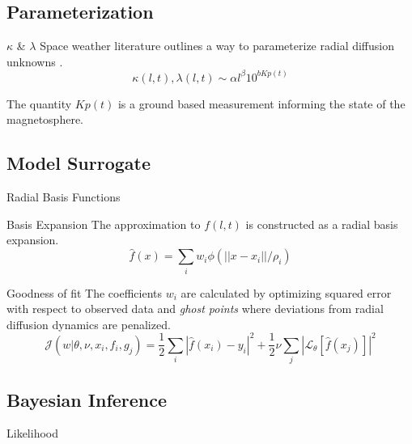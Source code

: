 \documentclass{beamer}
\begin{document}
\subsection{Parameterization}


\begin{frame}{$\kappa$ \& $\lambda$}
  Space weather literature outlines a way to parameterize radial
  diffusion unknowns \cite{JGRA:JGRA15067}.
  \begin{equation*}
    \kappa(l, t), \lambda(l, t) \sim \alpha l^{\beta} 10^{b Kp(t)}
  \end{equation*}

  The quantity $Kp(t)$ is a ground based measurement informing the
  state of the magnetosphere.
\end{frame}

\subsection{Model Surrogate}

\begin{frame}{Radial Basis Functions}
  \begin{block}{Basis Expansion}
    The approximation to $f(l, t)$ is constructed as a radial basis expansion.
    \begin{equation*}
      \hat{f}(x) = \sum_{i}{w_{i} \phi(||x - x_{i}||/\rho_{i})}
    \end{equation*}
  \end{block}

  \begin{block}{Goodness of fit}
    The coefficients $w_i$ are calculated by optimizing squared error
    with respect to observed data and \emph{ghost points} where
    deviations from radial diffusion dynamics are penalized.
    \begin{equation*}
      \mathcal{J}(w | \theta, \nu, x_{i}, f_{i}, g_{j}) = \frac{1}{2}\sum_{i}{|\hat{f}(x_{i}) -
        y_{i}|^2} + \frac{1}{2} \nu \sum_{j}{|\mathcal{L}_{\theta}[\hat{f}(x_{j})]|^2}
    \end{equation*}
  \end{block}
\end{frame}

\subsection{Bayesian Inference}

\begin{frame}{Likelihood}
\end{frame}
\end{document}
